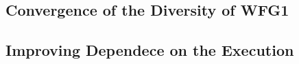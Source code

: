\subsection{Convergence of the Diversity of WFG1}

\begin{figure}[t]
\centering

\label{fig:Diversity}
\end{figure}


\subsection{Improving Dependece on the Execution}


%














